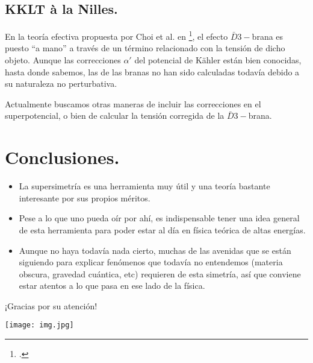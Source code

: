 \documentclass[10pt,a4paper]{beamer}
\begin{document}
\subsection{KKLT à la Nilles.}
\begin{frame}{\subsecname}
\label{sec:Nilles}
En la teoría efectiva propuesta por Choi et al. en \footcite{Nilles},
el efecto $\bar D3
-$brana es puesto ``a mano'' a través de un término relacionado con la tensión
de dicho objeto. Aunque las correcciones $\alpha'$ del potencial de Kähler están
bien conocidas, hasta donde sabemos, las de las branas no han sido calculadas
todavía debido a su naturaleza no perturbativa.

Actualmente buscamos otras maneras de incluir las correcciones en el
superpotencial, o bien de calcular la tensión corregida de la $\bar D3-$brana.
\end{frame}


\section{Conclusiones.}
\begin{frame}{\secname}
\label{sec:conc}
\begin{itemize}
  \item La supersimetría es una herramienta muy útil y una teoría bastante
    interesante por sus propios méritos.
  \item Pese a lo que uno pueda oír por ahí, es indispensable tener una idea
    general de esta herramienta para poder estar al día en física teórica de
    altas energías.
  \item Aunque no haya todavía nada cierto, muchas de las avenidas que se están
    siguiendo para explicar fenómenos que todavía no entendemos (materia
    obscura, gravedad cuántica, etc) requieren de esta simetría, así que
    conviene estar atentos a lo que pasa en ese lado de la física.
\end{itemize}
\end{frame}
\begin{frame}{¡Gracias por su atención!}
  \begin{center}
  \texttt{[image: img.jpg]}
  \end{center}
\end{frame}
\end{document}
